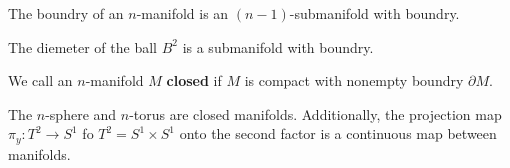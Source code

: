 \begin{lemma}\label{1.1.2}
    The boundry of an $n$-manifold is an $(n-1)$-submanifold with boundry.
\end{lemma}

\begin{example}\label{example.1.4}
    The diemeter of the ball $B^2$ is a submanifold with boundry.
\end{example}

\begin{definition}
    We call an $n$-manifold $M$ \textbf{closed} if $M$ is compact with nonempty
    boundry $\partial{M}$.
\end{definition}

\begin{example}\label{example_1.5}
    The $n$-sphere and  $n$-torus are closed manifolds. Additionally, the
    projection map  $\pi_y:T^2 \xrightarrow{} S^1$ fo $T^2=S^1 \times S^1$ onto
    the second factor is a continuous map between manifolds.
\end{example}
